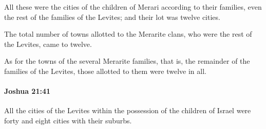 			\begin{versebox}
					\item[BHS] 
					\item[ASV] All these were the cities of the children of Merari according to their families, even the rest of the families of the Levites; and their lot was twelve cities.
					\item[NIV] The total number of towns allotted to the Merarite clans, who were the rest of the Levites, came to twelve.
					\item[NRSV] As for the towns of the several Merarite families, that is, the remainder of the families of the Levites, those allotted to them were twelve in all.
			\end{versebox}

		\paragraph{Joshua 21:41} %
			\label{JOSHUA-21-41}

			All the cities of the Levites within the possession of the children of Israel were forty and eight cities with their suburbs.


